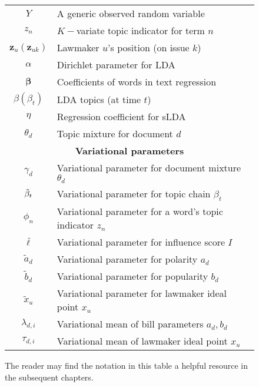 \begin{figure*}
\begin{tabular}{|c|l|}
      $Y$ & A generic observed random variable \\
      $z_n$ & $K-$variate topic indicator for term $n$ \\
      $\bm z_u (\bm z_{uk})$ & Lawmaker $u$'s position (on issue $k$) \\
      $\alpha$ & Dirichlet parameter for LDA \\
      $\bm \beta$ & Coefficients of words in text regression \\
      $\beta (\beta_t)$ & LDA topics (at time $t$) \\
      $\eta$ & Regression coefficient for sLDA \\
      $\theta_d$ & Topic mixture for document $d$ \\
      \hline
      \multicolumn{2}{|c|}{\textbf{Variational parameters}} \\
      \hline
      $\gamma_d$ & Variational parameter for document mixture $\theta_d$ \\
      $\tilde{\beta}_t$ & Variational parameter for topic chain $\beta_t$ \\
      $\phi_n$ & Variational parameter for a word's topic indicator $z_n$ \\
      $\tilde{\ell}$ & Variational parameter for influence score $I$ \\
      $\tilde a_d$ & Variational parameter for polarity $a_d$ \\
      $\tilde b_d$ & Variational parameter for popularity $b_d$ \\
      $\tilde x_u$ & Variational parameter for lawmaker ideal point $x_u$ \\
      $\lambda_{d,i}$ & Variational mean of bill parameters $a_d, b_d$
      \\
      $\tau_{d,i}$ & Variational mean of lawmaker ideal point $x_u$ \\
      \hline
    \end{tabular}
\caption{The reader may find the notation in this table a helpful resource in the
 subsequent chapters.}
  \label{fig:notation}
\end{figure*}
